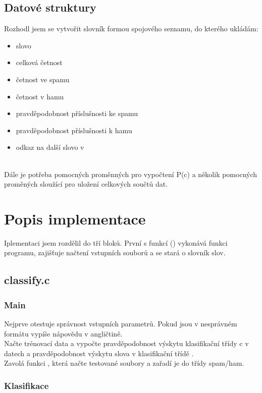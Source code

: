 \documentclass[12pt, a4paper]{report}
\begin{document}
\section{Datové struktury}
Rozhodl jsem se vytvořit slovník formou spojového seznamu, do kterého ukládám:
\begin{itemize}
	\item slovo
	\item celková četnost
	\item četnost ve spamu
	\item četnost v hamu
	\item pravděpodobnost příslušnosti ke spamu
	\item pravděpodobnost příslušnosti k hamu
	\item odkaz na další slovo v 
\end{itemize}
\\
Dále je potřeba pomocných proměnných pro vypočtení P(c) a několik pomocných proměných sloužící pro uložení celkových součtů dat.


\chapter{Popis implementace}

Iplementaci jsem rozdělil do tří bloků. První  s funkcí {\itmain()} vykonává funkci programu,  zajišťuje načtení vstupních souborů a  se stará o slovník slov.

\section{classify.c}
\subsection{Main}
Nejprve otestuje správnost vstupních parametrů. Pokud jsou v nesprávném formátu vypíše nápovědu v angličtině.\\
Načte trénovací data a vypočte pravděpodobnost výskytu klasifikační třídy c v datech  a pravděpodobnost výskytu slova v klasifikační třídě .\\
Zavolá funkci , která načte testované soubory a zařadí je do třídy spam/ham.

\subsection{Klasifikace}
\end{document}
